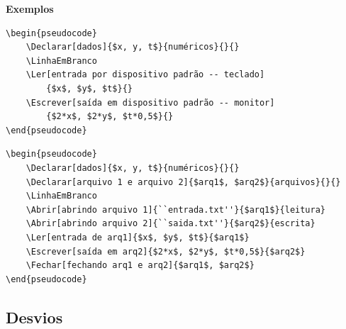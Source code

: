 \documentclass[a4paper,12pt,oneside,onecolumn,final,fleqn]{repUERJ}
\begin{document}
\noindent\textbf{Exemplos}

\begin{verbatim}
\begin{pseudocode}
    \Declarar[dados]{$x, y, t$}{numéricos}{}{}
    \LinhaEmBranco
    \Ler[entrada por dispositivo padrão -- teclado]
        {$x$, $y$, $t$}{}
    \Escrever[saída em dispositivo padrão -- monitor]
        {$2*x$, $2*y$, $t*0,5$}{}
\end{pseudocode}
\end{verbatim}

\noindent{}

\begin{verbatim}
\begin{pseudocode}
    \Declarar[dados]{$x, y, t$}{numéricos}{}{}
    \Declarar[arquivo 1 e arquivo 2]{$arq1$, $arq2$}{arquivos}{}{}
    \LinhaEmBranco
    \Abrir[abrindo arquivo 1]{``entrada.txt''}{$arq1$}{leitura}
    \Abrir[abrindo arquivo 2]{``saida.txt''}{$arq2$}{escrita}
    \Ler[entrada de arq1]{$x$, $y$, $t$}{$arq1$}
    \Escrever[saída em arq2]{$2*x$, $2*y$, $t*0,5$}{$arq2$}
    \Fechar[fechando arq1 e arq2]{$arq1$, $arq2$}
\end{pseudocode}
\end{verbatim}

\noindent{}

\subsection{Desvios}
\end{document}
